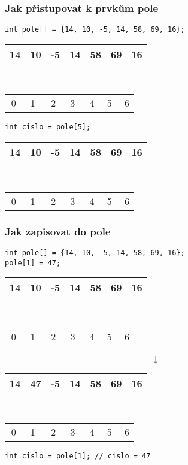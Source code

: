 \documentclass{beamer}
\begin{document}
\begin{frame}[t,fragile]\frametitle{Jak přistupovat k prvkům pole} 
\begin{verbatim} 
int pole[] = {14, 10, -5, 14, 58, 69, 16};
\end{verbatim}

\begin{tabular}{|c|c|c|c|c|c|c|}
\hline 14& 10 & -5 & 14 &58 &69& 16 \\\hline
\end{tabular}\\
\begin{tabular}{ccccccc}
 \,0\,\,\,&1\,\,\,\,&2\,\,\,&3\,\,\,&4\,\,&5\,\,&6
\end{tabular}
\vskip 1cm
\begin{verbatim} 
int cislo = pole[5];
\end{verbatim}

\begin{tabular}{|c|c|c|c|c|c|c|}
\hline 14& 10 & -5 & 14 &58 &{\color{red} 69}& 16 \\\hline
\end{tabular}\\
\begin{tabular}{ccccccc}
 \,0\,\,\,&1\,\,\,\,&2\,\,\,&3\,\,\,&4\,\,&{\color{red}5}\,\,&6
\end{tabular}

\end{frame}


\begin{frame}[t,fragile]\frametitle{Jak zapisovat do pole} 
\begin{verbatim} 
int pole[] = {14, 10, -5, 14, 58, 69, 16};
pole[1] = 47;
\end{verbatim}

\begin{center}
\begin{tabular}{|c|c|c|c|c|c|c|}
\hline 14& {\color{red}10} & -5 & 14 &58 &69& 16 \\\hline
\end{tabular}\\
\begin{tabular}{ccccccc}
 \,0\,\,\,&{\color{red}1}\,\,\,\,&2\,\,\,&3\,\,\,&4\,\,&5\,\,&6
\end{tabular}
$$
\downarrow
$$
\begin{tabular}{|c|c|c|c|c|c|c|}
\hline 14& {\color{red}47} & -5 & 14 &58 &69& 16 \\\hline
\end{tabular}\\
\begin{tabular}{ccccccc}
 \,0\,\,\,&{\color{red}1}\,\,\,\,&2\,\,\,&3\,\,\,&4\,\,&5\,\,&6
\end{tabular}
\end{center}

\begin{verbatim} 
int cislo = pole[1]; // cislo = 47
\end{verbatim}
\end{frame}
\end{document}
